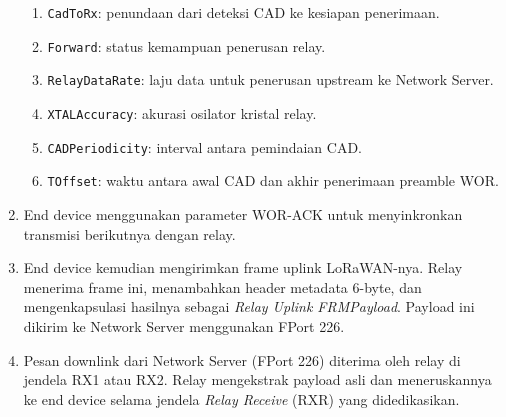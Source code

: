 \begin{enumerate}
\begin{enumerate}
              \item \texttt{CadToRx}: penundaan dari deteksi CAD ke kesiapan penerimaan.
              \item \texttt{Forward}: status kemampuan penerusan relay.
              \item \texttt{RelayDataRate}: laju data untuk penerusan upstream ke Network Server.
              \item \texttt{XTALAccuracy}: akurasi osilator kristal relay.
              \item \texttt{CADPeriodicity}: interval antara pemindaian CAD.
              \item \texttt{TOffset}: waktu antara awal CAD dan akhir penerimaan preamble WOR.
          \end{enumerate}
    \item End device menggunakan parameter WOR-ACK untuk menyinkronkan transmisi berikutnya dengan relay.
    \item End device kemudian mengirimkan frame uplink LoRaWAN-nya. Relay menerima frame ini, menambahkan header metadata 6-byte, dan mengenkapsulasi hasilnya sebagai \emph{Relay Uplink FRMPayload}. Payload ini dikirim ke Network Server menggunakan FPort 226.
    \item Pesan downlink dari Network Server (FPort 226) diterima oleh relay di jendela RX1 atau RX2. Relay mengekstrak payload asli dan meneruskannya ke end device selama jendela \emph{Relay Receive} (RXR) yang didedikasikan.
\end{enumerate}
